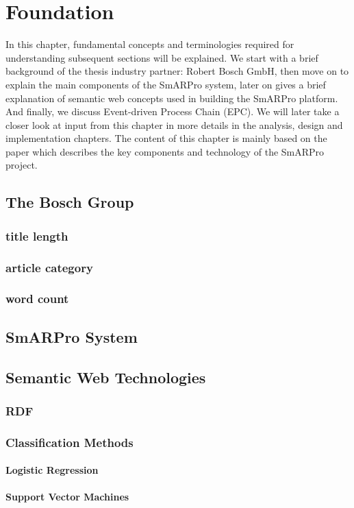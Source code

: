 \chapter{Foundation}
In this chapter, fundamental concepts and terminologies required for understanding subsequent sections will be explained. We start with a brief background of the thesis industry partner: Robert Bosch GmbH, then move on to explain the main components of the SmARPro system, later on gives a brief explanation of semantic web concepts used in building the SmARPro platform. And finally, we discuss Event-driven Process Chain (EPC). We will later take a closer look at input from this chapter in more details in the analysis, design and implementation chapters. The content of this chapter is mainly based on the paper  which describes the key components and technology of the SmARPro project.

\section{The Bosch Group}

\subsection{title length}
\subsection{article category}
\subsection{word count}


\section{SmARPro System}

\section{Semantic Web Technologies}

\subsection{RDF}


\subsection{Classification Methods}
\subsubsection{Logistic Regression}

\subsubsection{Support Vector Machines}














